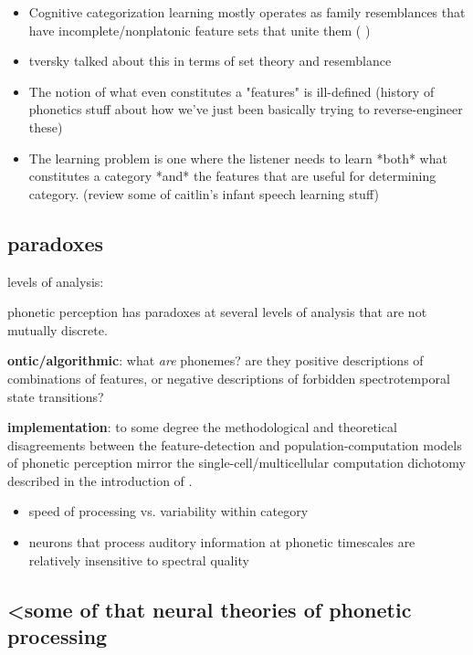 \begin{multicols}{2}
\begin{itemize}
	\item Cognitive categorization learning mostly operates as family resemblances that have incomplete/nonplatonic feature sets that unite them (\cite{roschFamilyResemblancesStudies1975}\cite{roschWittgensteinCategorizationResearch1987} \cite{couchmanRulesResemblanceTheir2010})
	\item tversky talked about this in terms of set theory and resemblance \cite{tverskyStudiesSimilarity1978} \cite{Tversky1970}
	\item The notion of what even constitutes a "features" is ill-defined (history of phonetics stuff about how we've just been basically trying to reverse-engineer these)
	\item The learning problem is one where the listener needs to learn *both* what constitutes a category *and* the features that are useful for determining category. (review some of caitlin's infant speech learning stuff)
\end{itemize}

\subsection{paradoxes}

levels of analysis:

phonetic perception has paradoxes at several levels of analysis that are not mutually discrete.

\textbf{ontic/algorithmic}: what \textit{are} phonemes? are they positive descriptions of combinations of features, or negative descriptions of forbidden spectrotemporal state transitions?

\textbf{implementation}: to some degree the methodological and theoretical disagreements between the feature-detection and population-computation models of phonetic perception mirror the single-cell/multicellular computation dichotomy described in the introduction of \cite{dubreuilComplementaryRolesDimensionality2020}. 

\begin{itemize}
	\item speed of processing vs. variability within category
	\item neurons that process auditory information at phonetic timescales are relatively insensitive to spectral quality \cite{norman-haignereHierarchicalIntegrationMultiple2020}
\end{itemize}

\subsection{<some of that neural theories of phonetic processing}


\end{multicols}
